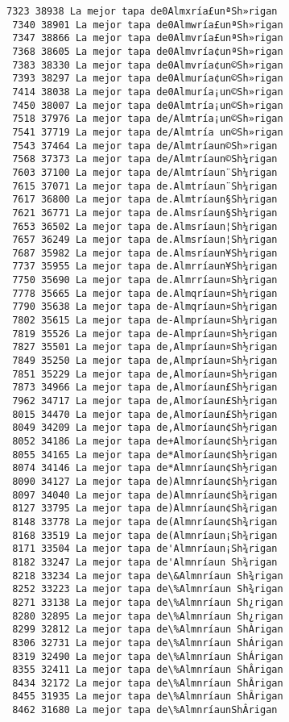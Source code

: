 \documentclass[11pt]{article}
\begin{document}
\begin{Verbatim}[commandchars=\\\{\}]
 7323 38938 La mejor tapa de0Almxría£unªSh»rigan
 7340 38901 La mejor tapa de0Almwría£unªSh»rigan
 7347 38866 La mejor tapa de0Almvría£unªSh»rigan
 7368 38605 La mejor tapa de0Almvría¢unªSh»rigan
 7383 38330 La mejor tapa de0Almvría¢un©Sh»rigan
 7393 38297 La mejor tapa de0Almuría¢un©Sh»rigan
 7414 38038 La mejor tapa de0Almuría¡un©Sh»rigan
 7450 38007 La mejor tapa de0Almtría¡un©Sh»rigan
 7518 37976 La mejor tapa de/Almtría¡un©Sh»rigan
 7541 37719 La mejor tapa de/Almtría un©Sh»rigan
 7543 37464 La mejor tapa de/Almtríaun©Sh»rigan
 7568 37373 La mejor tapa de/Almtríaun©Sh¼rigan
 7603 37100 La mejor tapa de/Almtríaun¨Sh¼rigan
 7615 37071 La mejor tapa de.Almtríaun¨Sh¼rigan
 7617 36800 La mejor tapa de.Almtríaun§Sh¼rigan
 7621 36771 La mejor tapa de.Almsríaun§Sh¼rigan
 7653 36502 La mejor tapa de.Almsríaun¦Sh¼rigan
 7657 36249 La mejor tapa de.Almsríaun¦Sh¼rigan
 7687 35982 La mejor tapa de.Almsríaun¥Sh¼rigan
 7737 35955 La mejor tapa de.Almrríaun¥Sh¼rigan
 7750 35690 La mejor tapa de.Almrríaun¤Sh¼rigan
 7778 35665 La mejor tapa de.Almqríaun¤Sh¼rigan
 7790 35638 La mejor tapa de-Almqríaun¤Sh¼rigan
 7802 35615 La mejor tapa de-Almpríaun¤Sh¼rigan
 7819 35526 La mejor tapa de-Almpríaun¤Sh½rigan
 7827 35501 La mejor tapa de,Almpríaun¤Sh½rigan
 7849 35250 La mejor tapa de,Almpríaun¤Sh½rigan
 7851 35229 La mejor tapa de,Almoríaun¤Sh½rigan
 7873 34966 La mejor tapa de,Almoríaun£Sh½rigan
 7962 34717 La mejor tapa de,Almoríaun£Sh½rigan
 8015 34470 La mejor tapa de,Almoríaun£Sh½rigan
 8049 34209 La mejor tapa de,Almoríaun¢Sh½rigan
 8052 34186 La mejor tapa de+Almoríaun¢Sh½rigan
 8055 34165 La mejor tapa de*Almoríaun¢Sh½rigan
 8074 34146 La mejor tapa de*Almnríaun¢Sh½rigan
 8090 34127 La mejor tapa de)Almnríaun¢Sh½rigan
 8097 34040 La mejor tapa de)Almnríaun¢Sh¾rigan
 8127 33795 La mejor tapa de)Almnríaun¢Sh¾rigan
 8148 33778 La mejor tapa de(Almnríaun¢Sh¾rigan
 8168 33519 La mejor tapa de(Almnríaun¡Sh¾rigan
 8171 33504 La mejor tapa de'Almnríaun¡Sh¾rigan
 8182 33247 La mejor tapa de'Almnríaun Sh¾rigan
 8218 33234 La mejor tapa de\&Almnríaun Sh¾rigan
 8252 33223 La mejor tapa de\%Almnríaun Sh¾rigan
 8271 33138 La mejor tapa de\%Almnríaun Sh¿rigan
 8280 32895 La mejor tapa de\%Almnríaun Sh¿rigan
 8299 32812 La mejor tapa de\%Almnríaun ShÀrigan
 8306 32731 La mejor tapa de\%Almnríaun ShÁrigan
 8319 32490 La mejor tapa de\%Almnríaun ShÁrigan
 8355 32411 La mejor tapa de\%Almnríaun ShÂrigan
 8434 32172 La mejor tapa de\%Almnríaun ShÂrigan
 8455 31935 La mejor tapa de\%Almnríaun ShÂrigan
 8462 31680 La mejor tapa de\%AlmnríaunShÂrigan

\end{Verbatim}
\end{document}

